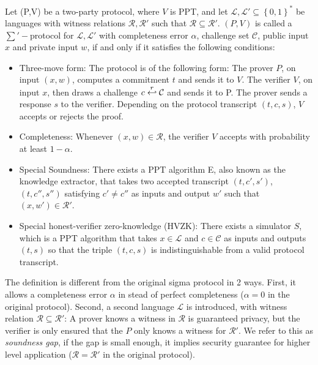 \begin{definition}
  \label{def:zkp-sum-protocol}
  Let (P,V) be a two-party protocol, where $V$ is PPT, and let
  $\mathcal{L},\mathcal{L'} \subseteq \left\{ 0,1 \right\}^*$ be languages with
  witness relations $\mathcal{R},\mathcal{R'}$ such that $\mathcal{R}
  \subseteq \mathcal{R'}$. $(P,V)$ is called a $\sum'-$protocol for
  $\mathcal{L}, \mathcal{L'}$ with completeness error $\alpha$, challenge set
  $\mathcal{C}$, public input $x$ and private input $w$, if and only if it
  satisfies the following conditions:
  \begin{itemize}
  \item Three-move form: The protocol is of the following form: The
    prover $P$, on input $(x,w)$, computes a commitment $t$ and sends it
    to $V$. The verifier $V$, on input $x$, then draws a challenge
    $c \stackrel{r}{\hookleftarrow} \mathcal{C}$ and sends it to P. The prover sends a
    response $s$ to the verifier. Depending on the protocol transcript
    $(t,c,s)$, $V$ accepts or rejects the proof.
  \item Completeness: Whenever $(x,w) \in \mathcal{R}$, the verifier
    $V$ accepts with probability at least $1 - \alpha$.
  \item Special Soundness: There exists a PPT algorithm E, also known as
    the knowledge extractor, that takes two accepted transcript
    $(t,c',s')$,$(t,c'',s'')$ satisfying $c' \neq c''$ as inputs and
    output $w'$ such that $(x,w') \in \mathcal{R'}$.
  \item Special honest-verifier zero-knowledge (HVZK): There exists a
    simulator $S$, which is a PPT
    algorithm that takes $x\in \mathcal{L}$ and $c \in \mathcal{C}$ as
    inputs and outputs $(t,s)$ so that the triple $(t,c,s)$ is
    indistinguishable from a valid protocol transcript.
  \end{itemize}
\end{definition}

The definition is different from the original sigma protocol in 2 ways.
First, it allows a completeness error $\alpha$ in stead of perfect completeness
($\alpha=0$ in the original protocol).
Second, a second language $\mathcal{L}$ is introduced, with witness relation
$\mathcal{R} \subseteq \mathcal{R'}$: A prover knows a witness in $\mathcal{R}$
is guaranteed privacy, but the verifier is only ensured that the $P$ only knows
a witness for $\mathcal{R'}$. We refer to this as \emph{soundness gap}, if the
gap is small enough, it implies security guarantee for higher level application
($\mathcal{R} = \mathcal{R'}$ in the original protocol).


